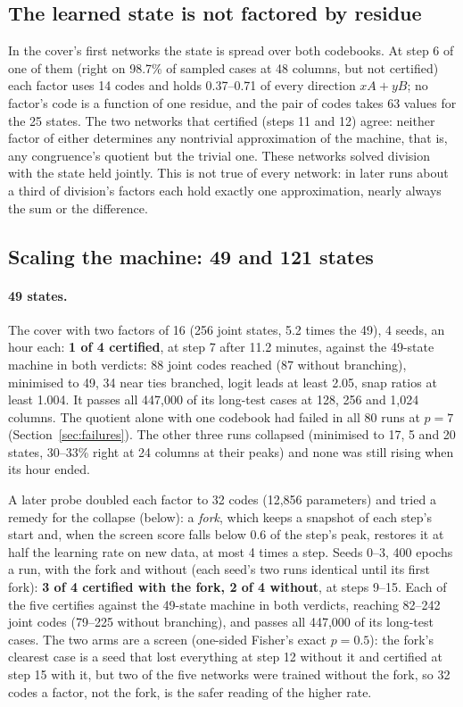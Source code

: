 \documentclass[11pt]{article}
\begin{document}
\subsection{The learned state is not factored by residue}
\label{sec:not-factored}

In the cover's first networks the state is spread over both codebooks. At step 6 of one of them (right
on 98.7\% of sampled cases at 48 columns, but not certified) each factor uses 14 codes and holds
0.37--0.71 of every direction $xA + yB$; no factor's code is a function of one residue, and the pair
of codes takes 63 values for the 25 states. The two networks that certified (steps 11 and 12) agree:
neither factor of either determines any nontrivial approximation of the machine, that is, any
congruence's quotient but the trivial one. These networks solved division with the state held
jointly. This is not true of every network: in later runs about a third of division's factors each
hold exactly one approximation, nearly always the sum or the difference.

\subsection{Scaling the machine: 49 and 121 states}
\label{sec:scaling}

\paragraph{49 states.}

The cover with two factors of 16 (256 joint states, 5.2 times the 49), 4 seeds, an hour each:
\textbf{1 of 4 certified}, at step 7 after 11.2 minutes, against the 49-state machine in both
verdicts: 88 joint codes reached (87 without branching), minimised to 49, 34 near ties branched,
logit leads at least 2.05, snap ratios at least 1.004. It passes all 447{,}000 of its long-test cases at 128, 256 and 1{,}024
columns. The
quotient alone with one codebook had failed in all 80 runs at $p = 7$ (Section~\ref{sec:failures}).
The other three runs collapsed (minimised to 17, 5 and 20 states, 30--33\% right at 24 columns at
their peaks) and none was still rising when its hour ended.

A later probe doubled each factor to 32 codes (12{,}856 parameters) and tried a remedy for the
collapse (below): a \emph{fork}, which keeps a snapshot of each step's start
and, when the screen score falls below 0.6 of the step's peak, restores it at half the learning rate
on new data, at most 4 times a step. Seeds 0--3, 400 epochs a run, with the fork and without (each
seed's two runs identical until its first fork): \textbf{3 of 4 certified with the fork, 2 of 4
without}, at steps 9--15. Each of the five certifies against the 49-state machine in both
verdicts, reaching 82--242 joint codes (79--225 without branching), and passes all 447{,}000 of its
long-test cases. The two arms are a screen (one-sided Fisher's exact $p = 0.5$): the fork's clearest
case is a seed that lost everything at step 12 without it and certified at step 15 with it, but two of
the five networks were trained without the fork, so 32 codes a factor, not the fork, is the safer
reading of the higher rate.
\end{document}
